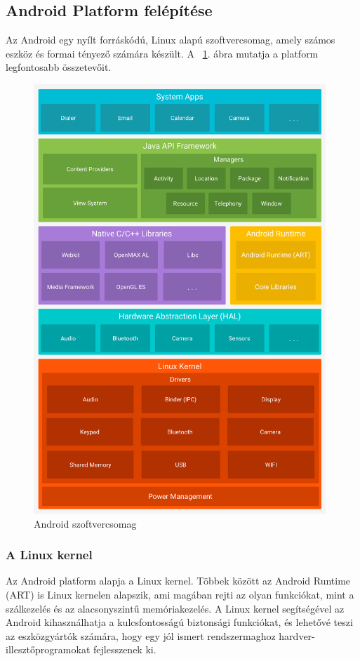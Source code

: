 \documentclass[../main.tex]{subfiles}
\begin{document}
    \subsection{Android Platform felépítése} %
        Az Android egy nyílt forráskódú, Linux alapú szoftvercsomag, amely számos eszköz és formai tényező számára készült. A ~\ref{fig:android_szoftvercsomag}. ábra mutatja a platform legfontosabb összetevőit.
        \begin{figure}[h!]
            \centering
            \includegraphics[width=11cm]{android_res/android_szoftvercsomag.png}
            \caption{Android szoftvercsomag}
            \label{fig:android_szoftvercsomag}
        \end{figure}
        
        \subsubsection{A Linux kernel}
            Az Android platform alapja a Linux kernel. Többek között az Android Runtime (ART) is Linux kernelen alapszik, ami magában rejti az olyan funkciókat, mint a szálkezelés és az alacsonyszintű  memóriakezelés.
            A Linux kernel segítségével az Android kihasználhatja a kulcsfontosságú biztonsági funkciókat, és lehetővé teszi az eszközgyártók számára, hogy egy jól ismert rendszermaghoz hardver-illesztőprogramokat fejlesszenek ki.
            
\end{document}
